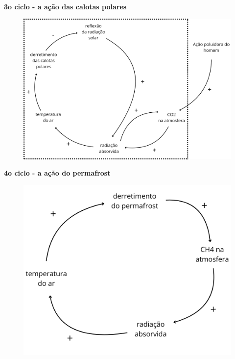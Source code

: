 \documentclass[11pt]{article}
\begin{document}
\begin{enumerate}
        \textbf{3o ciclo - a ação das calotas polares}\par
		\begin{figure}[!ht]
			\centering
			\includegraphics[width=0.79\linewidth]{mapa1-3.png}
		\end{figure}
\pagebreak
        \textbf{4o ciclo - a ação do permafrost}\par
		\begin{figure}[!ht]
			\centering
			\includegraphics[width=0.79\linewidth]{mapa1-4.png}
		\end{figure}


\end{enumerate}
\end{document}
